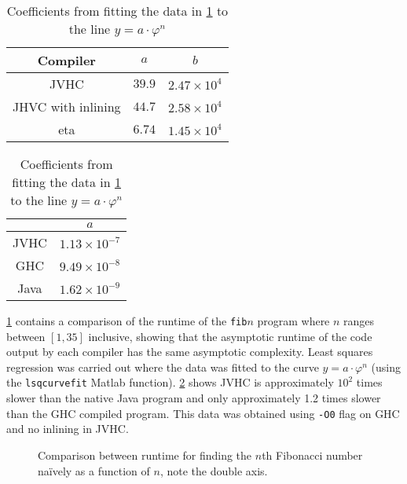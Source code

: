 \documentclass[float=false, crop=false]{standalone}
\newlength\gwidth
\newlength\gheight
\newcommand{\importMGraph}[3]{\setlength{\gwidth}{#2}\setlength{\gheight}{#3}{#1}}
\begin{document}
\begin{table}
  \centering
  \begin{minipage}{0.55\textwidth}
  \centering
  \begin{tabular}{ c | c c }
    Compiler& $a$ & $b$\\
    \hline
    JVHC & $39.9$ & $2.47 \times 10^{4}$ \\
    JHVC with inlining & $44.7$ & $2.58 \times 10^{4}$\\
    eta & $6.74$ & $1.45 \times 10^{4}$
  \end{tabular}
  \caption{Regression values for code size form data in \cref{plot:codeSize} to $y=a x+b$}
  \label{table:codeSize}
\end{minipage}\hfill
\begin{minipage}{0.42\textwidth}
  \centering
\begin{tabular}{c | c}
  & $a$\\
  \hline 
  JVHC & $1.13\times 10^{-7}$\\
  GHC & $9.49\times 10^{-8}$\\
  Java & $1.62 \times 10^{-9}$
\end{tabular}
\caption{Coefficients from fitting the data in \cref{plot:fibTiming} 
    to the line $y=a\cdot \varphi^n$}
  \label{table:fibCoef}
\end{minipage}

\end{table}

\cref{plot:fibTiming} contains a comparison of the runtime of the \texttt{fib}$n$ program where 
$n$ ranges between $[1,35]$ inclusive, showing that the asymptotic runtime of the code output
by each compiler has the same asymptotic complexity.
  Least squares regression was carried out where the data was fitted to the curve
  $y = a \cdot \varphi^n$ (using the \texttt{lsqcurvefit} Matlab function).
  \cref{table:fibCoef} shows
  JVHC is approximately $10^2$  times slower than the native
  Java program and only approximately 1.2 times slower than the GHC 
  compiled program.
  This data was obtained using \texttt{-O0} flag on GHC and no inlining
  in JVHC.

\begin{figure}
  \centering
  \importMGraph{plotFibRuntime}{0.93\textwidth}{0.4\textwidth}
  \caption[Comparison between runtime for finding the $n$th Fibonacci number na\"ively as a function of $n$ ]{Comparison between runtime for finding the $n$th Fibonacci number na\"ively as a 
  function of $n$, note the double axis.}
  \label{plot:fibTiming}
\end{figure}
\end{document}
